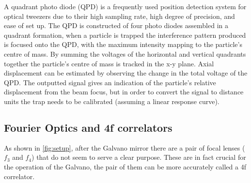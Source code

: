 A quadrant photo diode (QPD) is a frequently used position detection 
system for optical tweezers due to their high sampling rate, high 
degree of precision, and ease of set up. The QPD is constructed of 
four photo diodes assembled in a quadrant formation, when a particle 
is trapped the interference pattern produced is focused onto the QPD, 
with the maximum intensity mapping to the particle's centre of mass. 
By summing the voltages of the horizontal and vertical quadrants together 
the particle's centre of mass is tracked in the x-y plane. Axial 
displacement can be estimated by observing the change in the total 
voltage of the QPD. The outputted signal gives an indication of the 
particle's relative displacement from the beam focus, but in order to 
convert the signal to distance units the trap needs to be calibrated 
(assuming a linear response curve).

\subsection{Fourier Optics and 4f correlators}
\label{sec:4f_correlation}
As shown in \ref{fig:setup}, after the Galvano mirror there are a pair
of focal lenses ($f_3$ and $f_4$) that do not seem to serve a clear
purpose. These are in fact crucial for the operation of the Galvano, the
pair of them can be more accurately called a 4f correlator. 

